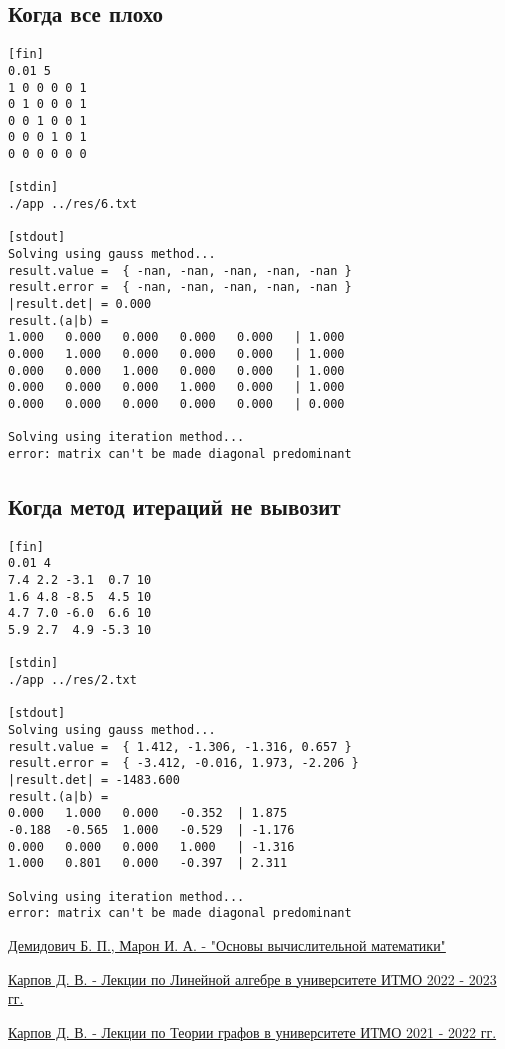 \documentclass{article}
\begin{document}
\subsection{Когда все плохо}
\begin{lstlisting}
[fin]
0.01 5
1 0 0 0 0 1
0 1 0 0 0 1
0 0 1 0 0 1
0 0 0 1 0 1
0 0 0 0 0 0

[stdin]
./app ../res/6.txt

[stdout]
Solving using gauss method...
result.value =  { -nan, -nan, -nan, -nan, -nan }
result.error =  { -nan, -nan, -nan, -nan, -nan }
|result.det| = 0.000
result.(a|b) = 
1.000   0.000   0.000   0.000   0.000   | 1.000
0.000   1.000   0.000   0.000   0.000   | 1.000
0.000   0.000   1.000   0.000   0.000   | 1.000
0.000   0.000   0.000   1.000   0.000   | 1.000
0.000   0.000   0.000   0.000   0.000   | 0.000

Solving using iteration method...
error: matrix can't be made diagonal predominant
\end{lstlisting}

\subsection{Когда метод итераций не вывозит}
\begin{lstlisting}
[fin]
0.01 4
7.4 2.2 -3.1  0.7 10
1.6 4.8 -8.5  4.5 10
4.7 7.0 -6.0  6.6 10
5.9 2.7  4.9 -5.3 10

[stdin]
./app ../res/2.txt

[stdout]
Solving using gauss method...
result.value =  { 1.412, -1.306, -1.316, 0.657 }
result.error =  { -3.412, -0.016, 1.973, -2.206 }
|result.det| = -1483.600
result.(a|b) = 
0.000   1.000   0.000   -0.352  | 1.875
-0.188  -0.565  1.000   -0.529  | -1.176
0.000   0.000   0.000   1.000   | -1.316
1.000   0.801   0.000   -0.397  | 2.311

Solving using iteration method...
error: matrix can't be made diagonal predominant
\end{lstlisting}

\begin{thebibliography}{9}

    \href{
        https://ikfia.ysn.ru/wp-content/uploads/2018/01/DemidovichMaron1966ru.pdf
    }{
        Демидович Б. П., Марон И. А. - "Основы вычислительной математики"
    }

    \href{
        https://logic.pdmi.ras.ru/~dvk/ITMO/Algebra/2022-23/5_Lin_space.pdf
    }{
        Карпов Д. В. - Лекции по Линейной алгебре в университете ИТМО
        2022 - 2023 гг.
    }

    \href{
        https://logic.pdmi.ras.ru/~dvk/ITMO/DM/2021-22/3_matchings.pdf
    }{
        Карпов Д. В. - Лекции по Теории графов в университете ИТМО
        2021 - 2022 гг.
    }

\end{thebibliography}
\end{document}
